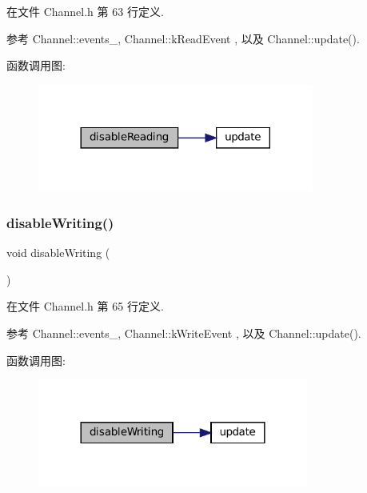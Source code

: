 在文件 Channel.\+h 第 63 行定义.



参考 Channel\+::events\+\_\+, Channel\+::k\+Read\+Event , 以及 Channel\+::update().

函数调用图\+:
\nopagebreak
\begin{figure}[H]
\begin{center}
\leavevmode
\includegraphics[width=257pt]{classmuduo_1_1net_1_1Channel_aa27263032d6b3a79edb4e99537293c37_cgraph}
\end{center}
\end{figure}
\mbox{\label{classmuduo_1_1net_1_1Channel_a97cbc4c0678234e62a4a9d906e064cdf}} 
\subsubsection{\texorpdfstring{disable\+Writing()}{disableWriting()}}
{\footnotesize\ttfamily void disable\+Writing (\begin{DoxyParamCaption}{ }\end{DoxyParamCaption})\hspace{0.3cm}{\ttfamily [inline]}}



在文件 Channel.\+h 第 65 行定义.



参考 Channel\+::events\+\_\+, Channel\+::k\+Write\+Event , 以及 Channel\+::update().

函数调用图\+:
\nopagebreak
\begin{figure}[H]
\begin{center}
\leavevmode
\includegraphics[width=252pt]{classmuduo_1_1net_1_1Channel_a97cbc4c0678234e62a4a9d906e064cdf_cgraph}
\end{center}
\end{figure}
\mbox{\label{classmuduo_1_1net_1_1Channel_a3fbec0f3acd6ebea5b36f77f653303b4}} 
